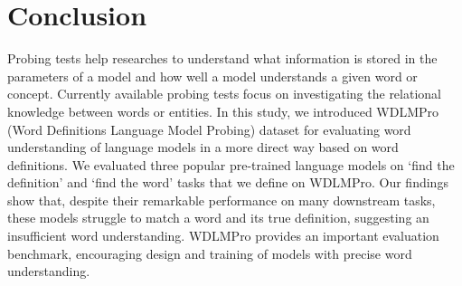 \documentclass[11pt,a4paper]{article}
\begin{document}
\section{Conclusion}

Probing tests help researches to understand what information is stored in the parameters of a model and how well a model understands a given word or concept. Currently available probing tests focus on investigating the relational knowledge between words or entities. In this study, we introduced WDLMPro (Word Definitions Language Model Probing) dataset for evaluating word understanding of language models in a more direct way based on word definitions. We evaluated three popular pre-trained language models on `find the definition' and `find the word' tasks that we define on WDLMPro. Our findings show that, despite their remarkable performance on many downstream tasks, these models struggle to match a word and its true definition, suggesting an insufficient word understanding. WDLMPro provides an important evaluation benchmark, encouraging design and training of models with precise word understanding.



\end{document}
